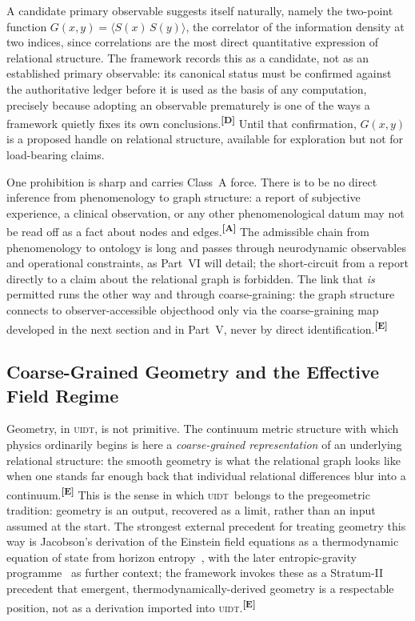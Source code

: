 \documentclass[12pt,a4paper,twoside]{article}
\theoremstyle{plain}
\theoremstyle{definition}
\theoremstyle{remark}
\newcommand{\UIDT}{\textsc{uidt}}
\newcommand{\catmark}[1]{\textsuperscript{\textsf{\textbf{[#1]}}}}
\begin{document}
A candidate primary observable suggests itself naturally, namely the two-point function $G(x,y) = \langle S(x)\,S(y)\rangle$, the correlator of the information density at two indices, since correlations are the most direct quantitative expression of relational structure. The framework records this as a candidate, not as an established primary observable: its canonical status must be confirmed against the authoritative ledger before it is used as the basis of any computation, precisely because adopting an observable prematurely is one of the ways a framework quietly fixes its own conclusions.\catmark{D} Until that confirmation, $G(x,y)$ is a proposed handle on relational structure, available for exploration but not for load-bearing claims.

One prohibition is sharp and carries Class~A force. There is to be no direct inference from phenomenology to graph structure: a report of subjective experience, a clinical observation, or any other phenomenological datum may not be read off as a fact about nodes and edges.\catmark{A} The admissible chain from phenomenology to ontology is long and passes through neurodynamic observables and operational constraints, as Part~VI will detail; the short-circuit from a report directly to a claim about the relational graph is forbidden. The link that \emph{is} permitted runs the other way and through coarse-graining: the graph structure connects to observer-accessible objecthood only via the coarse-graining map developed in the next section and in Part~V, never by direct identification.\catmark{E}

\subsection{Coarse-Grained Geometry and the Effective Field Regime}
\label{subsec:coarse-geometry-eft}

Geometry, in \UIDT, is not primitive. The continuum metric structure with which physics ordinarily begins is here a \emph{coarse-grained representation} of an underlying relational structure: the smooth geometry is what the relational graph looks like when one stands far enough back that individual relational differences blur into a continuum.\catmark{E} This is the sense in which \UIDT\ belongs to the pregeometric tradition: geometry is an output, recovered as a limit, rather than an input assumed at the start. The strongest external precedent for treating geometry this way is Jacobson's derivation of the Einstein field equations as a thermodynamic equation of state from horizon entropy~\cite{jacobson1995}, with the later entropic-gravity programme~\cite{padmanabhan2010,verlinde2011,chirco2014} as further context; the framework invokes these as a Stratum-II precedent that emergent, thermodynamically-derived geometry is a respectable position, not as a derivation imported into \UIDT.\catmark{E}
\end{document}
